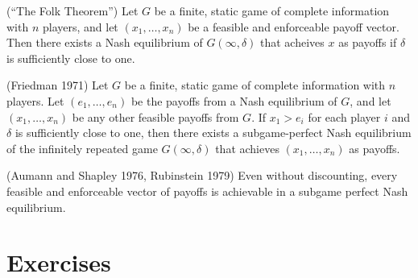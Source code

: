 \documentclass[10pt]{article}
\begin{document}
\begin{spacing}{1.0}
\begin{theorem}
  (``The Folk Theorem'') Let $G$ be a finite, static game of complete
  information with $n$ players, and let $(x_1, \ldots, x_n)$ be a feasible
  and enforceable payoff vector. Then there exists a Nash equilibrium of
  $G(\infty, \delta)$ that acheives $x$ as payoffs if $\delta$ is
  sufficiently close to one.
\end{theorem}

\begin{theorem}
  (Friedman 1971) Let $G$ be a finite, static game of
  complete information with $n$ players. Let $(e_1,
  \ldots, e_n)$ be the payoffs from a Nash equilibrium of
  $G$, and let $(x_1, \ldots, x_n)$ be any other feasible
  payoffs from $G$. If $x_1 > e_i$ for each player $i$
  and $\delta$ is sufficiently close to one, then there
  exists a subgame-perfect Nash equilibrium of the
  infinitely repeated game $G(\infty, \delta)$ that
  achieves $(x_1, \ldots, x_n)$ as payoffs.
\end{theorem}

\begin{theorem}
  (Aumann and Shapley 1976, Rubinstein 1979) Even without discounting,
  every feasible and enforceable vector of payoffs is achievable in a
  subgame perfect Nash equilibrium.
\end{theorem}

\newpage
\section{Exercises}


\end{spacing}
\end{document}
